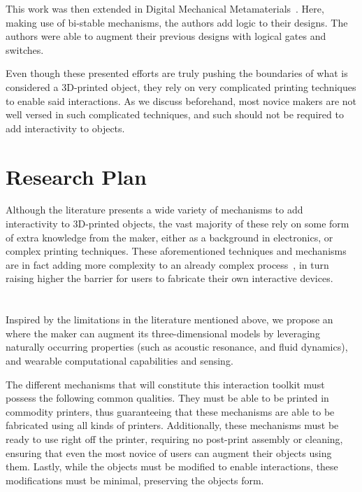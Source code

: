       This work was then extended in Digital Mechanical
      Metamaterials~\cite{Ion:2017bo}. Here, making use of bi-stable
      mechanisms, the authors add logic to their designs. The authors were able
      to augment their previous designs with logical gates and switches.

      Even though these presented efforts are truly pushing the boundaries of
      what is considered a 3D-printed object, they rely on very complicated
      printing techniques to enable said interactions. As we discuss
      beforehand, most novice makers are not well versed in such complicated
      techniques, and such should not be required to add interactivity to
      objects.

  \section{Research Plan}
    Although the literature presents a wide variety of mechanisms to add
    interactivity to 3D-printed objects, the vast majority of these rely on some
    form of extra knowledge from the maker, either as a background in
    electronics, or complex printing techniques. These
    aforementioned techniques and mechanisms are in fact adding more complexity
    to an already complex process~\cite{Hudson:2016hi, Mellis:2012ba,
    Weichel:2014ed}, in turn raising higher the barrier for users to fabricate
    their own interactive devices.

  \section{\itoolkit}
    Inspired by the limitations in the literature mentioned above, we propose
    an \itoolkit where the maker can augment its three-dimensional
    models by leveraging naturally occurring properties (such as acoustic
    resonance, and fluid dynamics), and wearable computational capabilities and
    sensing.
    
    The different mechanisms that will constitute this interaction toolkit must
    possess the following common qualities. They must be able to be printed in
    commodity printers, thus guaranteeing that these mechanisms are able to be
    fabricated using all kinds of printers. Additionally, these mechanisms must
    be ready to use right off the printer, requiring no post-print assembly or
    cleaning, ensuring that even the most novice of users can augment their
    objects using them. Lastly, while the objects must be modified to enable
    interactions, these modifications must be minimal, preserving the objects
    form.
    
